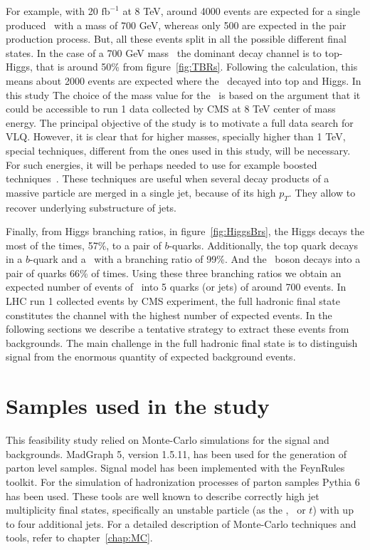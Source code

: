 For example, with 20 $\text{fb}^{-1}$ at 8 TeV, around 4000 events are expected for a single produced \Tp~with a mass of 700 GeV, whereas only 500 are expected in the pair production process. But, all these events split in all the possible different final states. In the case of a 700 GeV mass \Tp~the dominant decay channel is to top-Higgs, that is around 50\% from figure~\ref{fig:TBRs}. Following the calculation, this means about 2000 events are expected where the \Tp~decayed into top and Higgs. In this study The choice of the mass value for the \Tp~is based on the argument that it could be accessible to run 1 data collected by CMS at 8 TeV center of mass energy. The principal objective of the study is to motivate a full data search for VLQ. However, it is clear that for higher masses, specially higher than 1 TeV, special techniques, different from the ones used in this study, will be necessary. For such energies, it will be perhaps needed to use for example boosted techniques~\cite{CMS:2013vca, ATLAS-CONF-2013-084, Usai:2015vva}. These techniques are useful when several decay products of a massive particle are merged in a single jet, because of its high $p_{T}$. They allow to recover underlying substructure of jets.

Finally, from Higgs branching ratios, in figure~\ref{fig:HiggsBrs}, the Higgs decays the most of the times, 57\%, to a pair of $b$-quarks. Additionally, the top quark decays in a $b$-quark and a \W~with a branching ratio of 99\%. And the \W~boson decays into a pair of quarks 66\% of times. Using these three branching ratios we obtain an expected number of events of \Tp~into 5 quarks (or jets) of around 700 events. In LHC run 1 collected events by CMS experiment, the full hadronic final state constitutes the channel with the highest number of expected events. In the following sections we describe a tentative strategy to extract these events from backgrounds. The main challenge in the full hadronic final state is to distinguish signal from the enormous quantity of expected background events.


\section{Samples used in the study}
\label{sec:PhenoSam}

This feasibility study relied on Monte-Carlo simulations for the signal and backgrounds. MadGraph 5, version 1.5.11, has been used for the generation of parton level samples. Signal model has been implemented with the FeynRules toolkit. For the simulation of hadronization processes of parton samples Pythia 6 has been used. These tools are well known to describe correctly high jet multiplicity final states, specifically an unstable particle (as the \W, \Z~or $t$) with up to four additional jets. For a detailed description of Monte-Carlo techniques and tools, refer to chapter~\ref{chap:MC}. 

